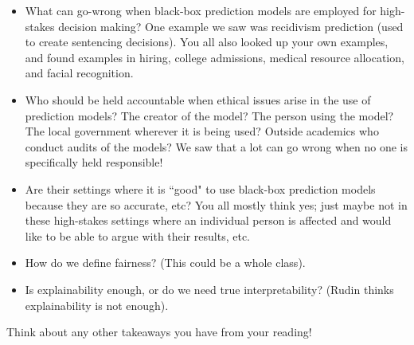 \begin{itemize}
\item What can go-wrong when black-box prediction models are employed for high-stakes decision making? One example we saw was recidivism prediction (used to create sentencing decisions). You all also looked up your own examples, and found examples in hiring, college admissions, medical resource allocation, and facial recognition.
\item Who should be held accountable when ethical issues arise in the use of prediction models? The creator of the model? The person using the model? The local government wherever it is being used? Outside academics who conduct audits of the models? We saw that a lot can go wrong when no one is specifically held responsible! 
\item Are their settings where it is ``good" to use black-box prediction models because they are so accurate, etc? You all mostly think yes; just maybe not in these high-stakes settings where an individual person is affected and would like to be able to argue with their results, etc. 
\item How do we define fairness? (This could be a whole class).
\item Is explainability enough, or do we need true interpretability? (Rudin thinks explainability is not enough). 
\end{itemize}

Think about any other takeaways you have from your reading! 







